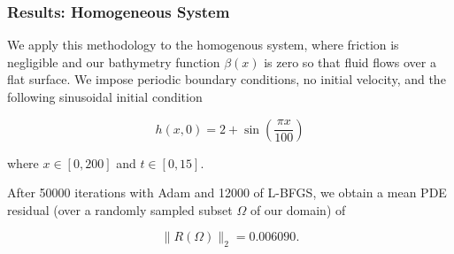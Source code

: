 \begin{frame}
    \frametitle{Results: Homogeneous System}

    We apply this methodology to the homogenous system, where friction is negligible and our bathymetry function 
    $\beta(x)$ is zero so that fluid flows over a flat surface.  We impose periodic boundary conditions, no initial 
    velocity, and the following sinusoidal initial condition

    $$
    h(x, 0) = 2 + \sin{\left( \frac{\pi x}{100} \right)}
    $$

    where $x \in [0, 200]$ and $t \in [0, 15]$.

    \bigskip
    \pause

    After 50000 iterations with Adam and 12000 of L-BFGS, we obtain a mean PDE residual (over a randomly sampled 
    subset $\Omega$ of our domain) of 
    
    $$
    \lVert R(\Omega) \rVert_2 = 0.006090.
    $$
\end{frame}